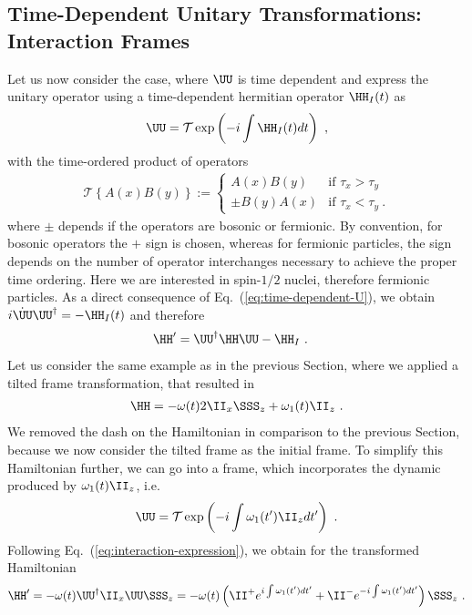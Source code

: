 \subsection{Time-Dependent Unitary Transformations: Interaction Frames}
\label{sec:inter}
Let us now consider the case, where $\UU$ is time dependent and express the unitary operator using a time-dependent hermitian operator $\HH_I(t)$ as
\begin{align}
\label{eq:time-dependent-U}
\UU = \mathcal{T} \exp\left({-i \int \HH_I(t) dt}\right)~,
\end{align}
with the time-ordered product of operators 
\begin{align}
  \label{eq:time-ordering-operator}
  \mathcal {T}
  \left\{A(x)B(y)\right\}
  :=\begin{cases}A(x)B(y)
       &{\text{if }}\tau _{x}>\tau _{y}\\
       \pm B(y)A(x)&{\text{if }}\tau _{x}<\tau _{y}~.
     \end{cases}
\end{align}
where $\pm$ depends if the operators are bosonic or fermionic.
By convention, for bosonic operators the $+$ sign is chosen, whereas for fermionic particles, the sign depends on the number of operator interchanges necessary to achieve the proper time ordering. Here we are interested in spin-$1/2$ nuclei, therefore fermionic particles.  
As a direct consequence of Eq.~(\ref{eq:time-dependent-U}), we obtain $i \dot{\UU}\UU^{\dagger}= -\HH_I(t)$ and therefore
\begin{align}
  \label{eq:interaction-expression}
\HH' &= \UU^\dagger \HH \UU  - \HH_I~.
\end{align}
Let us consider the same example as in the previous Section, where we applied a tilted frame transformation, that resulted in 
\begin{align}
  \HH = - \omega(t) 2 \II_x\SSS_z +\omega_1(t) \II_z~.
\end{align}
We removed the dash on the Hamiltonian in comparison to the previous Section, because we now consider the tilted frame as the initial frame.
To simplify this Hamiltonian further, we can go into a frame, which incorporates the dynamic produced by $\omega_1(t) \II_z$, i.e.
\begin{align}
  \label{eq:time-dependent-U-with-H}
\UU = \mathcal{T} \exp\left({-i \int \omega_1(t') \II_z dt'}\right)~.
\end{align}
Following Eq.~(\ref{eq:interaction-expression}), we obtain for the transformed Hamiltonian
\begin{align}
  \HH' = - \omega(t)\UU^{\dagger}\II_x\UU\SSS_z = - \omega(t)
  \left(\II^+e^{i\int\omega_1(t')dt'}+ \II^-e^{-i\int\omega_1(t')dt'}\right)\SSS_z~.
\end{align}
